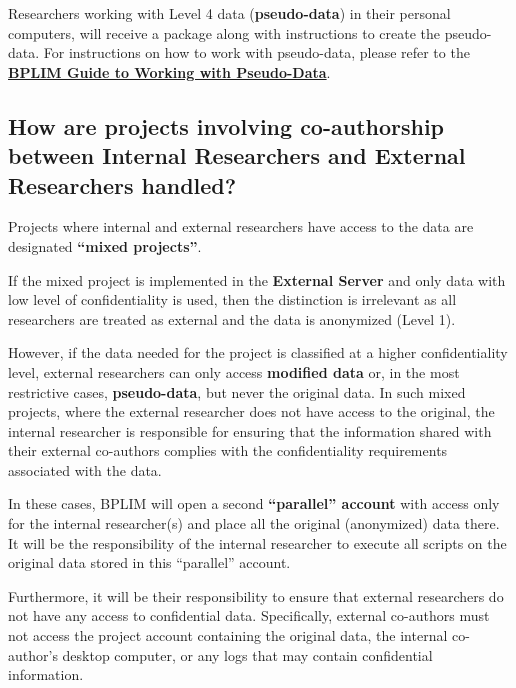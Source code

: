 \documentclass[
  a4paper,
  DIV=11,
  numbers=noendperiod]{scrartcl}
\begin{document}
Researchers working with Level 4 data (\textbf{pseudo-data}) in their
personal computers, will receive a package along with instructions to
create the pseudo-data. For instructions on how to work with
pseudo-data, please refer to the
\href{https://github.com/BPLIM/Manuals/tree/master/Guides/07_Working_with_Pseudo-Data}{\textbf{BPLIM
Guide to Working with Pseudo-Data}}.

\hypertarget{how-are-projects-involving-co-authorship-between-internal-researchers-and-external-researchers-handled}{%
\subsection{How are projects involving co-authorship between Internal
Researchers and External Researchers
handled?}\label{how-are-projects-involving-co-authorship-between-internal-researchers-and-external-researchers-handled}}

Projects where internal and external researchers have access to the data
are designated \textbf{``mixed projects''}.

If the mixed project is implemented in the \textbf{External Server} and
only data with low level of confidentiality is used, then the
distinction is irrelevant as all researchers are treated as external and
the data is anonymized (Level 1).

However, if the data needed for the project is classified at a higher
confidentiality level, external researchers can only access
\textbf{modified data} or, in the most restrictive cases,
\textbf{pseudo-data}, but never the original data. In such mixed
projects, where the external researcher does not have access to the
original, the internal researcher is responsible for ensuring that the
information shared with their external co-authors complies with the
confidentiality requirements associated with the data.

In these cases, BPLIM will open a second \textbf{``parallel'' account}
with access only for the internal researcher(s) and place all the
original (anonymized) data there. It will be the responsibility of the
internal researcher to execute all scripts on the original data stored
in this ``parallel'' account.

Furthermore, it will be their responsibility to ensure that external
researchers do not have any access to confidential data. Specifically,
external co-authors must not access the project account containing the
original data, the internal co-author's desktop computer, or any logs
that may contain confidential information.
\end{document}
